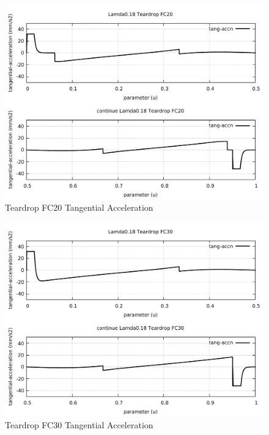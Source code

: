 \begin{figure}
	\caption     {Teardrop FC20 Tangential Acceleration}
	\label{22-img-Teardrop-FC20-Tangential-Acceleration.pdf}
	\includegraphics[width=1.00\textwidth]{Chap4/appendix/app-Teardrop/plots/22-img-Teardrop-FC20-Tangential-Acceleration.pdf}
\end{figure}

\clearpage
\pagebreak

\begin{figure}
	\caption     {Teardrop FC30 Tangential Acceleration}
	\label{23-img-Teardrop-FC30-Tangential-Acceleration.pdf}
	\includegraphics[width=1.00\textwidth]{Chap4/appendix/app-Teardrop/plots/23-img-Teardrop-FC30-Tangential-Acceleration.pdf}
\end{figure}


